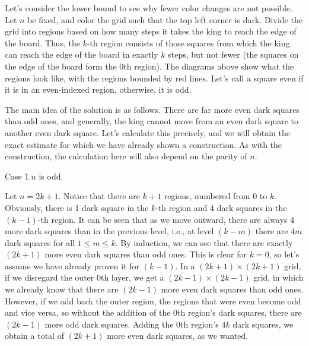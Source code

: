 \documentclass{article}
\begin{document}
Let's consider the lower bound to see why fewer color changes are not possible. Let \(\displaystyle n\) be fixed, and color the grid such that the top left corner is dark. Divide the grid into regions based on how many steps it takes the king to reach the edge of the board. Thus, the \(\displaystyle k\)-th region consists of those squares from which the king can reach the edge of the board in exactly \(\displaystyle k\) steps, but not fewer (the squares on the edge of the board form the 0th region). The diagrams above show what the regions look like, with the regions bounded by red lines. Let's call a square even if it is in an even-indexed region, otherwise, it is odd.

The main idea of the solution is as follows. There are far more even dark squares than odd ones, and generally, the king cannot move from an even dark square to another even dark square. Let's calculate this precisely, and we will obtain the exact estimate for which we have already shown a construction. As with the construction, the calculation here will also depend on the parity of \(\displaystyle n\).

Case 1.\(\displaystyle n\) is odd.

Let \(\displaystyle n=2k+1\). Notice that there are \(\displaystyle k+1\) regions, numbered from 0 to \(\displaystyle k\). Obviously, there is 1 dark square in the \(\displaystyle k\)-th region and 4 dark squares in the \(\displaystyle (k-1)\)-th region. It can be seen that as we move outward, there are always 4 more dark squares than in the previous level, i.e., at level \(\displaystyle (k-m)\) there are \(\displaystyle 4m\) dark squares for all \(\displaystyle 1 \leq m \leq k\). By induction, we can see that there are exactly \(\displaystyle (2k+1)\) more even dark squares than odd ones. This is clear for \(\displaystyle k=0\), so let's assume we have already proven it for \(\displaystyle (k-1)\). In a \(\displaystyle (2k+1) \times (2k+1)\) grid, if we disregard the outer 0th layer, we get a \(\displaystyle (2k-1) \times (2k-1)\) grid, in which we already know that there are \(\displaystyle (2k-1)\) more even dark squares than odd ones. However, if we add back the outer region, the regions that were even become odd and vice versa, so without the addition of the 0th region's dark squares, there are \(\displaystyle (2k-1)\) more odd dark squares. Adding the 0th region's \(\displaystyle 4k\) dark squares, we obtain a total of \(\displaystyle (2k+1)\) more even dark squares, as we wanted.
\end{document}
